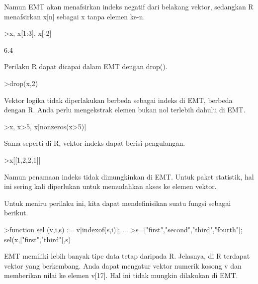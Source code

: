 \documentclass[a4paper,10pt]{article}
\begin{document}
\begin{eulernotebook}
\begin{eulercomment}
\begin{eulercomment}
\begin{eulercomment}
Namun EMT akan menafsirkan indeks negatif dari belakang vektor,
sedangkan R menafsirkan x[n] sebagai x tanpa elemen ke-n.
\end{eulercomment}
\begin{eulerprompt}
>x, x[1:3], x[-2]
\end{eulerprompt}
\begin{euleroutput}
  [10.4,  5.6,  3.1,  6.4,  21.7]
  [10.4,  5.6,  3.1]
  6.4
\end{euleroutput}
\begin{eulercomment}
Perilaku R dapat dicapai dalam EMT dengan drop().
\end{eulercomment}
\begin{eulerprompt}
>drop(x,2)
\end{eulerprompt}
\begin{euleroutput}
  [10.4,  3.1,  6.4,  21.7]
\end{euleroutput}
\begin{eulercomment}
Vektor logika tidak diperlakukan berbeda sebagai indeks di EMT,
berbeda dengan R. Anda perlu mengekstrak elemen bukan nol terlebih
dahulu di EMT.
\end{eulercomment}
\begin{eulerprompt}
>x, x>5, x[nonzeros(x>5)]
\end{eulerprompt}
\begin{euleroutput}
  [10.4,  5.6,  3.1,  6.4,  21.7]
  [1,  1,  0,  1,  1]
  [10.4,  5.6,  6.4,  21.7]
\end{euleroutput}
\begin{eulercomment}
Sama seperti di R, vektor indeks dapat berisi pengulangan.
\end{eulercomment}
\begin{eulerprompt}
>x[[1,2,2,1]]
\end{eulerprompt}
\begin{euleroutput}
  [10.4,  5.6,  5.6,  10.4]
\end{euleroutput}
\begin{eulercomment}
Namun penamaan indeks tidak dimungkinkan di EMT. Untuk paket
statistik, hal ini sering kali diperlukan untuk memudahkan akses ke
elemen vektor.

Untuk meniru perilaku ini, kita dapat mendefinisikan suatu fungsi
sebagai berikut.
\end{eulercomment}
\begin{eulerprompt}
>function sel (v,i,s) := v[indexof(s,i)]; ...
>s=["first","second","third","fourth"]; sel(x,["first","third"],s)
\end{eulerprompt}
\begin{euleroutput}
  [10.4,  3.1]
\end{euleroutput}
\begin{eulercomment}
EMT memiliki lebih banyak tipe data tetap daripada R. Jelasnya, di R
terdapat vektor yang berkembang. Anda dapat mengatur vektor numerik
kosong v dan memberikan nilai ke elemen v[17]. Hal ini tidak mungkin
dilakukan di EMT.


\end{eulercomment}
\end{eulercomment}
\end{eulercomment}
\end{eulernotebook}
\end{document}

